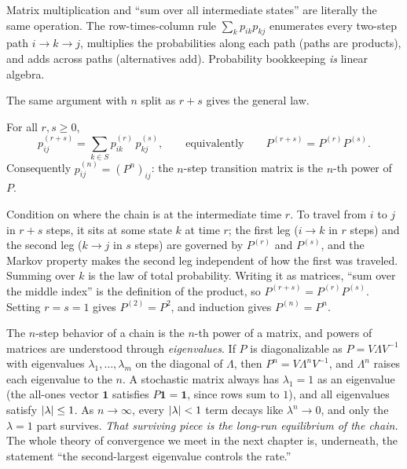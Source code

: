 \begin{intuitionbox}
Matrix multiplication and ``sum over all intermediate states'' are literally the same
operation. The row-times-column rule $\sum_k p_{ik} p_{kj}$ enumerates every two-step path
$i \to k \to j$, multiplies the probabilities along each path (paths are products), and adds
across paths (alternatives add). Probability bookkeeping \emph{is} linear algebra.
\end{intuitionbox}

The same argument with $n$ split as $r + s$ gives the general law.

\begin{theorem}
\label{ch23:chapman-kolmogorov}
For all $r, s \ge 0$,
\[
  p_{ij}^{(r+s)} = \sum_{k \in S} p_{ik}^{(r)}\, p_{kj}^{(s)},
  \qquad\text{equivalently}\qquad
  P^{(r+s)} = P^{(r)} P^{(s)}.
\]
Consequently $p_{ij}^{(n)} = (P^n)_{ij}$: the $n$-step transition matrix is the $n$-th power
of $P$.
\end{theorem}

\begin{whybox}
Condition on where the chain is at the intermediate time $r$. To travel from $i$ to $j$ in
$r+s$ steps, it sits at some state $k$ at time $r$; the first leg ($i \to k$ in $r$ steps) and
the second leg ($k \to j$ in $s$ steps) are governed by $P^{(r)}$ and $P^{(s)}$, and the
Markov property makes the second leg independent of how the first was traveled. Summing over
$k$ is the law of total probability. Writing it as matrices, ``sum over the middle index'' is
the definition of the product, so $P^{(r+s)} = P^{(r)}P^{(s)}$. Setting $r=s=1$ gives
$P^{(2)} = P^2$, and induction gives $P^{(n)} = P^n$.
\end{whybox}

\begin{connectionbox}
The $n$-step behavior of a chain is the $n$-th
power of a matrix, and powers of matrices are understood through \emph{eigenvalues}. If $P$ is
diagonalizable as $P = V \Lambda V^{-1}$ with eigenvalues $\lambda_1, \dots, \lambda_m$ on the
diagonal of $\Lambda$, then $P^n = V \Lambda^n V^{-1}$, and $\Lambda^n$ raises each
eigenvalue to the $n$. A stochastic matrix always has $\lambda_1 = 1$ as an eigenvalue (the
all-ones vector $\mathbf{1}$ satisfies $P\mathbf{1} = \mathbf{1}$, since rows sum to $1$), and
all eigenvalues satisfy $\lvert\lambda\rvert \le 1$. As $n \to \infty$, every $\lvert\lambda\rvert < 1$
term decays like $\lambda^n \to 0$, and only the $\lambda = 1$ part survives. \emph{That
surviving piece is the long-run equilibrium of the chain.} The whole theory of convergence we
meet in the next chapter is, underneath, the statement ``the second-largest eigenvalue
controls the rate.''
\end{connectionbox}

